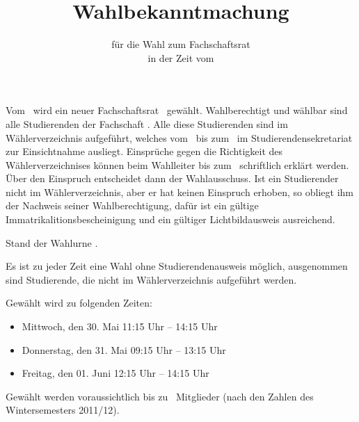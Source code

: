 

\geometry{a4paper,left=20mm,right=20mm, top=0cm, bottom=1.5cm} 


\title{Wahlbekanntmachung}
\subtitle{für die Wahl zum Fachschaftsrat \fach \\ in der Zeit vom \zeit}
\parindent 0pt
\parskip 10pt
\date{}

\pagestyle{empty}
\thispagestyle{empty}
\renewcommand{\titlepagestyle}{empty}
\vspace{-0.5cm}
\maketitle


\vspace{-5\baselineskip}
Vom \zeit ~wird ein neuer Fachschaftsrat \fach ~gewählt. Wahlberechtigt und wählbar sind alle Studierenden der Fachschaft \fach.
Alle diese Studierenden sind im Wählerverzeichnis aufgeführt, welches vom \einsichtStart ~bis zum \einsichtEnde ~im Studierendensekretariat zur Einsichtnahme ausliegt. Einsprüche gegen die Richtigkeit des Wählerverzeichnises können beim Wahlleiter bis zum \einsichtEnde ~schriftlich erklärt werden. Über den Einspruch entscheidet dann der Wahlausschuss. Ist ein Studierender nicht im Wählerverzeichnis, aber er hat keinen Einspruch erhoben, so obliegt ihm der Nachweis seiner Wahlberechtigung, dafür ist ein gültige Immatrikalitionsbescheinigung und ein gültiger Lichtbildausweis ausreichend.

Stand der Wahlurne \ort.

Es ist zu jeder Zeit eine Wahl ohne Studierendenausweis möglich, ausgenommen sind Studierende, die nicht im Wählerverzeichnis aufgeführt werden.

Gewählt wird zu folgenden Zeiten:
\begin{itemize}
\item Mittwoch, den 30. Mai 11:15 Uhr – 14:15 Uhr
\item Donnerstag, den 31. Mai 09:15 Uhr – 13:15 Uhr
\item Freitag, den 01. Juni 12:15 Uhr – 14:15 Uhr 

\end{itemize}

Gewählt werden voraussichtlich bis zu \maxWahl ~Mitglieder (nach den Zahlen des Wintersemesters 2011/12).

